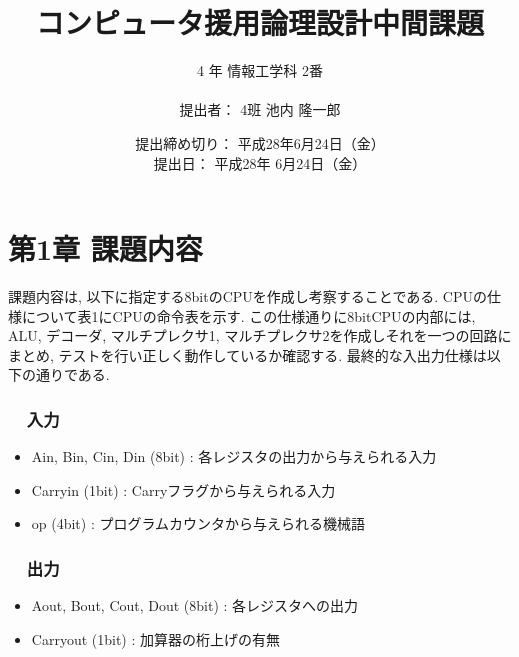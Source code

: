\documentclass[12pt]{jreport}
\title{コンピュータ援用論理設計中間課題 \vspace{5cm}}
\author{\hspace{10cm} 4 年 情報工学科 2番 \\\\\hspace{9cm} 提出者： 4班 池内 隆一郎}
\date{\vspace{5cm}\hspace{-10cm}提出締め切り： 平成28年6月24日（金）\\\hspace{-115mm} 提出日： 平成28年 6月24日（金）\\\hspace{-143mm}}
\begin{document}
    
    \maketitle
    \newpage

    \chapter*{第1章 課題内容}
         課題内容は, 以下に指定する8bitのCPUを作成し考察することである.  CPUの仕様について表1にCPUの命令表を示す. この仕様通りに8bitCPUの内部には, ALU, デコーダ, マルチプレクサ1, マルチプレクサ2を作成しそれを一つの回路にまとめ, テストを行い正しく動作しているか確認する. 最終的な入出力仕様は以下の通りである. 
         
         \subsection*{\ \ 入力}
            \begin{itemize}
                \item Ain, Bin, Cin, Din (8bit) : 各レジスタの出力から与えられる入力
                \item Carryin (1bit) : Carryフラグから与えられる入力
                \item op (4bit) : プログラムカウンタから与えられる機械語
            \end{itemize}
         \subsection*{\ \ 出力}
            \begin{itemize}
                \item Aout, Bout, Cout, Dout (8bit) : 各レジスタへの出力
                \item Carryout (1bit) : 加算器の桁上げの有無
            \end{itemize}
\end{document}
